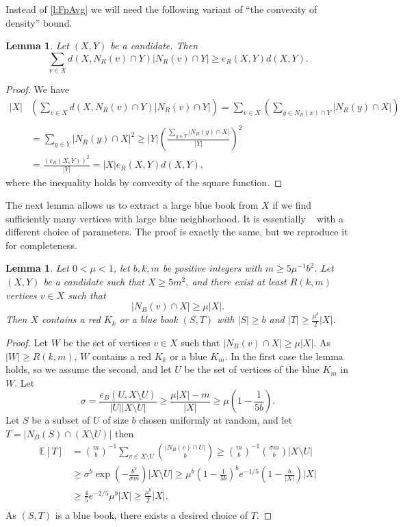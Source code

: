 \documentclass[reqno,final,12pt]{amsart}
\newtheorem{lem}[thm]{Lemma}
\newcommand{\bb}[1]{\mathbb{#1}}
\newcommand{\fs}[2]{\left(\frac{#1}{#2}\right)}
\newcommand{\s}[1]{\left(#1\right)}
\begin{document}
Instead of \cref{l:FpAvg}   we will need the following variant of ``the convexity of density'' bound.
 
 \begin{lem}\label{l:FpAvg2}
 	Let $(X,Y)$ be a candidate. Then \begin{equation}
 	\sum_{v\in X}d(X,N_R(v) \cap Y)|N_R(v) \cap Y| \geq e_R(X,Y)d(X,Y).
 	\end{equation}
 \end{lem}
 \begin{proof}
We have
 	\begin{align*}
 |X|&\s{\sum_{v\in X}d(X,N_R(v) \cap Y)|N_R(v) \cap Y|} = \sum_{v\in X} \s{\sum_{y \in N_R(x) \cap Y} |N_R(y) \cap X|} \\
 \\
 		 &= \sum_{y \in Y}|N_R(y) \cap X|^2 \geq  |Y|\fs{\sum_{y \in Y}|N_R(y) \cap X|}{|Y|}^2 \\ &=\frac{(e_R(X,Y))^2}{|Y|}  =|X| e_R(X,Y)d(X,Y),
 	\end{align*}
 	where the inequality holds by convexity of the square function.
 \end{proof}	

The next lemma allows us to extract a large blue book from $X$ if we find sufficiently many vertices with large blue neighborhood. It is essentially ~\cite[Lemma 4.1]{CGMS23} with a different choice of parameters. The proof is exactly the same, but we reproduce it for completeness.  

\begin{lem}\label{l:BBook}
	Let $0< \mu < 1$, let $b,k,m$ be positive integers  with $m \geq 5\mu^{-1}b^2$. Let $(X,Y)$ be a candidate such that $X \geq 5m^2$, and there exist at least $R(k,m)$ vertices $v \in X$ such that 
	$$ |N_B(v) \cap X| \geq \mu|X|.$$
	Then $X$ contains a red $K_k$ or a blue book $(S,T)$ with $|S| \geq b$ and $|T| \geq  \frac{\mu^b}{2}|X|$.
\end{lem}

\begin{proof}
	Let $W$ be the set of vertices $v \in X$ such that 	$ |N_B(v) \cap X| \geq \mu|X|.$ As $|W| \geq R(k,m)$, $W$ contains a  red $K_k$ or a blue $K_m$. In the first case the lemma holds, so we assume the second, and  let $U$ be the set of vertices of the blue $K_m$  in $W$. Let $$ \sigma = \frac{e_B(U,X\setminus U)}{|U||X \setminus U|} \geq \frac{\mu|X|-m}{|X|}  \geq \mu \s{1- \frac{1}{5b}}.$$
	Let $S$ be a subset of $U$ of size $b$ chosen uniformly at random, and let $T=|N_B(S) \cap (X \setminus U)|$ then \begin{align*}\bb{E}[T] &=\binom{m}{b}^{-1}\sum_{v \in X \setminus U}\binom{|N_B(v) \cap U|}{b} \geq \binom{m}{b}^{-1}\binom{\sigma m}{b}|X \setminus U| \\ & \geq \sigma^b\exp\s{-\frac{b^2}{\sigma m}}|X \setminus U| \geq \mu^b\s{1- \frac{1}{5b}}^b  e^{-1/5}\s{1-\frac{b}{|X|}}|X| \\ &\geq \frac{4}{5}e^{-2/5} \mu^b|X| \geq \frac{\mu^b}{2}|X| .\\ & \end{align*}
	As $(S,T)$ is a blue book, there exists a desired choice of $T$.
\end{proof}	
\end{document}
